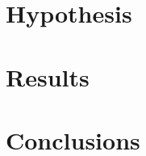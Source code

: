 \documentclass[Ingles]{ic-tese-v3}
\begin{document}
\chapter{Hypothesis}


\chapter{Results}


\chapter{Conclusions}







\end{document}
